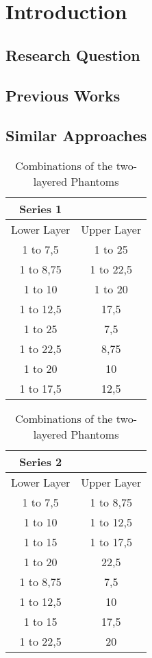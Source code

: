  
\chapter{Introduction}
\section{Research Question}
\section{Previous Works}
\section{Similar Approaches}

\begin{table}[htbp]
\caption{Combinations of the two-layered Phantoms}
\begin{minipage}{0.4\textwidth}
\centering
\begin{tabular}{|c|c|}\hline
Series 1 & \\ \hline
  Lower Layer & Upper Layer \\ \hline
 1 to 7,5 & 1 to 25  \\ \hline
 1 to 8,75 & 1 to 22,5\\ \hline
 1 to 10 & 1 to 20\\ \hline
 1 to 12,5 & 17,5 \\ \hline 
 1 to 25 & 7,5 \\ \hline
 1 to 22,5 & 8,75 \\ \hline
 1 to 20 & 10 \\ \hline
 1 to 17,5 & 12,5 \\ \hline			
\end{tabular}
\end{minipage}
\hfill
\begin{minipage}{0.4\textwidth}
\centering
\begin{tabular}{|c|c|}\hline
Series 2 & \\ \hline
  Lower Layer & Upper Layer \\ \hline
 1 to 7,5 & 1 to 8,75  \\ \hline
 1 to 10 & 1 to 12,5\\ \hline
 1 to 15 & 1 to 17,5\\ \hline
 1 to 20 & 22,5 \\ \hline 
 1 to 8,75 & 7,5 \\ \hline
 1 to 12,5 & 10 \\ \hline
 1 to 15 & 17,5 \\ \hline
 1 to 22,5 & 20 \\ \hline			
  \end{tabular}
\end{minipage}
\end{table}



